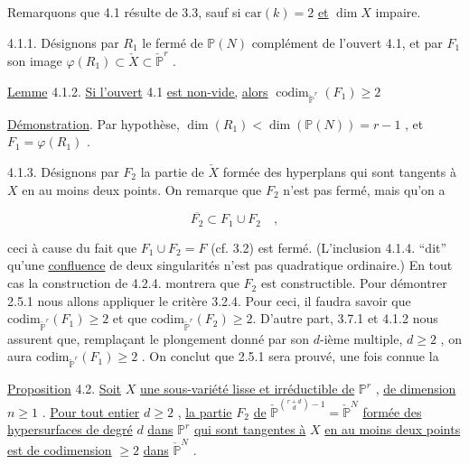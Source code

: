 Remarquons que 4.1 résulte de 3.3, sauf si $\mathrm{car}(k) = 2$ \underline{et} $\dim X$ impaire.

4.1.1. Désignons par $R_1$ le fermé de $\mathbb{P}(N)$ complément de l'ouvert 4.1, et par $F_1$ son image $\varphi(R_1) \subset \check{X} \subset \check{\mathbb{P}}^r$ .

\underline{Lemme} 4.1.2. \underline{Si l'ouvert} 4.1 \underline{est non-vide,} \underline{alors} $\operatorname{codim}_{\check{\mathbb{P}}^r}(F_1) \geqslant 2$

\underline{Démonstration}. Par hypothèse, $\dim(R_1) < \dim(\mathbb{P}(N)) = r-1$ , et $F_1 = \varphi(R_1)$ .

4.1.3. Désignons par $F_2$ la partie de $\check{X}$ formée des hyperplans qui sont tangents à $X$ en au moins deux points. On remarque que $F_2$ n'est
pas fermé, mais qu'on a

\begin{equation}\tag{4.1.4}
\overline{F_2}\subset F_1\cup F_2 \quad ,
\end{equation}

ceci à cause du fait que $F_1 \cup F_2 = F$ (cf. 3.2) est fermé. (L'inclusion 4.1.4. ``dit'' qu'une \underline{confluence} de deux singularités n'est pas quadratique ordinaire.) En tout cas la construction de 4.2.4. montrera que $F_2$ est constructible. Pour démontrer 2.5.1 nous allons appliquer le critère 3.2.4. Pour ceci, il faudra savoir que $\mathrm{codim}_{\check{\mathbb{P}}^r}(F_1) \geq 2$ et que $\mathrm{codim}_{\check{\mathbb{P}}^r}(F_2) \geq 2$. D'autre part, 3.7.1 et 4.1.2 nous assurent que, remplaçant le plongement donné par son $d$-ième multiple, $d \geq 2$ , on aura $\mathrm{codim}_{\check{\mathbb{P}}^r}(F_1) \geq 2$ . On conclut que 2.5.1 sera prouvé, une fois connue la

\underline{Proposition} 4.2. \underline{Soit} $X$ \underline{une sous-variété lisse et irréductible de} $\mathbb{P}^r$ , \underline{de dimension} $n \geq 1$ . \underline{Pour tout entier} $d \geq 2$ , \underline{la partie} $F_2$ \underline{de} $\check{\mathbb{P}}^{{r+d \choose d}-1} = \check{\mathbb{P}}^N$ \underline{formée des hypersurfaces de degré} $d$ \underline{dans} $\mathbb{P}^r$ \underline{qui sont tangentes à} $X$ \underline{en au moins deux points est de codimension} $\geq 2$ \underline{dans} $\check{\mathbb{P}}^N$ .

